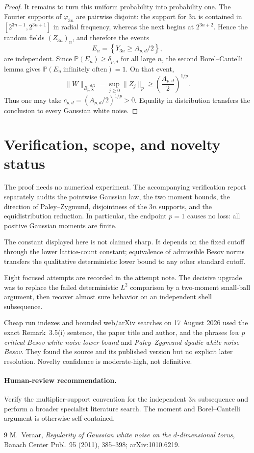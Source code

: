 \documentclass[11pt]{article}
\newcommand{\Pp}{\mathbb P}
\begin{document}
\begin{proof}
It remains to turn this uniform probability into probability one.  The
Fourier supports of $\varphi_{3n}$ are pairwise disjoint: the support for
$3n$ is contained in
$[2^{3n-1},2^{3n+1}]$ in radial frequency, whereas the next begins at
$2^{3n+2}$.  Hence the random fields $(Z_{3n})_n$, and therefore the events
\[
 E_n=\left\{Y_{3n}\ge A_{p,d}/2\right\},
\]
are independent.  Since $\Pp(E_n)\ge\delta_{p,d}$ for all large $n$, the
second Borel--Cantelli lemma gives $\Pp(E_n\ \text{infinitely often})=1$.
On that event,
\[
 \|W\|_{B^{-d/2}_{p,\infty}}
 =\sup_{j\ge0}\|Z_j\|_p
 \ge \left(\frac{A_{p,d}}2\right)^{1/p}.
\]
Thus one may take $c_{p,d}=(A_{p,d}/2)^{1/p}>0$.  Equality in distribution
transfers the conclusion to every Gaussian white noise.
\end{proof}

\section*{Verification, scope, and novelty status}

The proof needs no numerical experiment.  The accompanying verification
report separately audits the pointwise Gaussian law, the two moment bounds,
the direction of Paley--Zygmund, disjointness of the $3n$ supports, and the
equidistribution reduction.  In particular, the endpoint $p=1$ causes no
loss: all positive Gaussian moments are finite.

The constant displayed here is not claimed sharp.  It depends on the fixed
cutoff through the lower lattice-count constant; equivalence of admissible
Besov norms transfers the qualitative deterministic lower bound to any other
standard cutoff.

Eight focused attempts are recorded in the attempt note.  The decisive
upgrade was to replace the failed deterministic $L^2$ comparison by a
two-moment small-ball argument, then recover almost sure behavior on an
independent shell subsequence.

Cheap run indexes and bounded web/arXiv searches on 17 August 2026 used the
exact Remark~3.5(i) sentence, the paper title and author, and the phrases
\emph{low $p$ critical Besov white noise lower bound} and
\emph{Paley--Zygmund dyadic white noise Besov}.  They found the source and its
published version but no explicit later resolution.  Novelty confidence is
moderate-high, not definitive.

\paragraph{Human-review recommendation.}
Verify the multiplier-support convention for the independent $3n$
subsequence and perform a broader specialist literature search.  The moment
and Borel--Cantelli argument is otherwise self-contained.

\begin{thebibliography}{9}
M.~Veraar,
\emph{Regularity of Gaussian white noise on the $d$-dimensional torus},
Banach Center Publ. 95 (2011), 385--398; arXiv:1010.6219.
\end{thebibliography}
\end{document}
